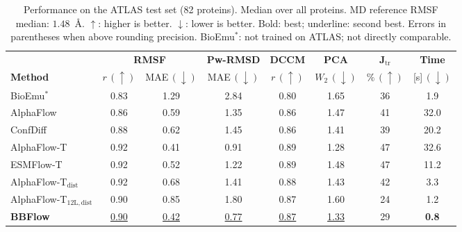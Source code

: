 \documentclass[12pt,a4paper]{article}
\begin{document}
\begin{table}[h]
  \centering
  \caption{Performance on the ATLAS test set (82 proteins).  Median over all proteins.
    MD reference RMSF median: $1.48$~Å.  $\uparrow$: higher is better.
    $\downarrow$: lower is better.  Bold: best; underline: second best.
    Errors in parentheses when above rounding precision.
    BioEmu$^*$: not trained on ATLAS; not directly comparable.}
  \label{tab:main_results}
  \small
  \begin{tabular}{lccccccc}
    \toprule
    & \multicolumn{2}{c}{\textbf{RMSF}} & \textbf{Pw-RMSD} & \textbf{DCCM}
      & \textbf{PCA} & $\bm{J_{\mathrm{tr}}}$ & \textbf{Time} \\
    \cmidrule(lr){2-3}
    \textbf{Method} & $r\,(\uparrow)$ & MAE$\,(\downarrow)$ & MAE$\,(\downarrow)$
      & $r\,(\uparrow)$ & $W_2\,(\downarrow)$ & $\%\,(\uparrow)$ & [s]$\,(\downarrow)$ \\
    \midrule
    BioEmu$^*$            & 0.83 & 1.29         & 2.84         & 0.80 & 1.65         & 36 & 1.9 \\
    AlphaFlow             & 0.86 & 0.59         & 1.35         & 0.86 & 1.47         & 41 & 32.0 \\
    ConfDiff              & 0.88 & 0.62         & 1.45         & 0.86 & 1.41         & 39 & 20.2 \\
    AlphaFlow-T           & 0.92 & 0.41         & 0.91         & 0.89 & 1.28         & 47 & 32.6 \\
    ESMFlow-T             & 0.92 & 0.52         & 1.22         & 0.89 & 1.48         & 47 & 11.2 \\
    AlphaFlow-T$_{\mathrm{dist}}$ & 0.92 & 0.68 & 1.41        & 0.88 & 1.43         & 42 & 3.3 \\
    AlphaFlow-T$_{12\mathrm{L,dist}}$ & 0.90 & 0.85 & 1.80    & 0.87 & 1.60         & 24 & 1.2 \\
    \midrule
    \textbf{BBFlow}       & \underline{0.90} & \underline{0.42} & \underline{0.77}
      & \underline{0.87} & \underline{1.33} & 29 & \textbf{0.8} \\
    \bottomrule
  \end{tabular}
\end{table}
\end{document}
